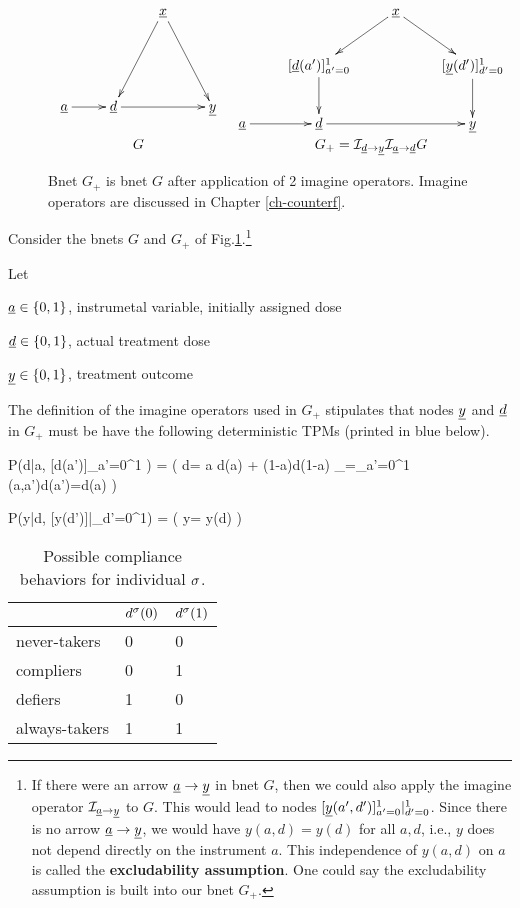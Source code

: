 \begin{figure}[h!]
$$
\begin{array}{ccccc}
\xymatrix{
&&\rvx\ar[ddl]\ar[ddr]
\\
\\
\rva\ar[r]
&\rvd\ar[rr]&&\rvy
}
&
\xymatrix{
&&\rvx\ar[dl]\ar[dr]
\\
&
[\rvd(a')]_{a'=0}^1\ar[d]
&
&[\rvy(d')]_{d'=0}^1\ar[d]
\\
\rva\ar[r]
&\rvd\ar[rr]&&\rvy
}
\\
G
&
G_+=
\cali_{\rvd\rarrow \rvy}
\cali_{\rva\rarrow \rvd}G
\end{array}
$$
\caption{
Bnet $G_+$ is bnet $G$
after application of 2
imagine operators.
Imagine operators
are discussed in Chapter \ref{ch-counterf}.
}
\label{fig-late-g-gplus}
\end{figure}

Consider
the bnets
$G$
and $G_+$
of 
Fig.\ref{fig-late-g-gplus}.\footnote{If there were an arrow
${\underline{a}}\rightarrow {\underline{y}}$
in bnet $G$,
then we could also
apply the imagine 
operator ${\cal I}_{{\underline{a}}\rightarrow
{\underline{y}}}$ to $G$.
This would lead to
nodes 
$[{\underline{y}}(a',d')]_{a'=0}^1|_{d'=0}^1$.
Since
there is no arrow
${\underline{a}}\rightarrow {\underline{y}}$, we would have
$y(a, d)=y(d)$
for all $a,d$,
i.e., $y$
does not depend
directly on 
the instrument $a$.
This independence
of $y(a,d)$ on $a$ is called the
{\bf excludability
assumption}.
One could say
the excludability
assumption
is built into
our bnet $G_+$.}

Let

${\underline{a}}\in \{0,1\}$, instrumetal
variable,
initially assigned dose

${\underline{d}}\in \{0,1\}$, actual treatment 
dose

${\underline{y}}\in \{0,1\}$, treatment outcome

The  definition of the 
imagine
operators 
used in $G_+$
stipulates
that nodes
${\underline{y}}$ and
${\underline{d}}$
in $G_{+}$
must be have the following
deterministic TPMs
(printed in blue below).


\beq\color{blue}
P(d|a,
[d(a')]_{a'=0}^1
) = \indi(\quad
d= \underbrace 
{a d(a) + (1-a)d(1-a)}
_{=\sum_{a'=0}^1
\delta(a,a')d(a')\quad=\quad d(a)}
\quad)
\eeq

\beq\color{blue}
P(y|d,
[y(d')]|_{d'=0}^1)
= \indi(\quad
y= 
y(d)
\quad)
\eeq

\begin{table}[h!]
\centering
\begin{tabular}{|l|l|l|}
\hline
 & \cellcolor[HTML]{ECF4FF}$d^\sigma(0)$ & \cellcolor[HTML]{ECF4FF}$d^\sigma(1)$ \\ \hline
\cellcolor[HTML]{ECF4FF}never-takers & 0 & 0 \\ \hline
\cellcolor[HTML]{ECF4FF}compliers & 0 & 1 \\ \hline
\cellcolor[HTML]{ECF4FF}defiers & 1 & 0 \\ \hline
\cellcolor[HTML]{ECF4FF}always-takers & 1 & 1 \\ \hline
\end{tabular}
\caption{Possible compliance
behaviors  for individual $\sigma$.}
\label{tab-late compliance}
\end{table}

